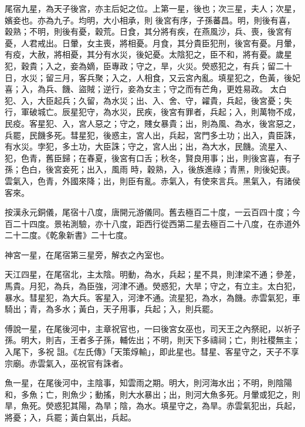 \begin{pinyinscope}
 尾宿九星，為天子後宮，亦主后妃之位。上第一星，後也；次三星，夫人；次星，嬪妾也。亦為九子。均明，大小相承，則
 後宮有序，子孫蕃昌。明，則後有喜，穀熟；不明，則後有憂，穀荒。日食，其分將有疾，在燕風沙，兵、喪，後宮有憂，人君戒出。日暈，女主喪，將相憂。月食，其分貴臣犯刑，後宮有憂。月暈，有疫，大赦，將相憂，其分有水災，後妃憂。太陰犯之，臣不和，將有憂。歲星犯，穀貴；入之，妾為嫡，臣專政；守之，旱，火災。熒惑犯之，有兵；留二十日，水災；留三月，客兵聚；入之，人相食，又云宮內亂。填星犯之，色黃，後妃喜；入，為兵、饑、盜賊；逆行，妾為女主；守之而有芒角，更姓易政。
 太白犯、入，大臣起兵；久留，為水災；出、入、舍、守，糴貴，兵起，後宮憂；失行，軍破城亡。辰星犯守，為水災，民疾，後宮有罪者，兵起；入，則萬物不成，民疫。客星犯、入，宮人惡之；守之，賤女暴貴；出，則為風、為水，後宮惡之，兵罷，民饑多死。彗星犯，後惑主，宮人出，兵起，宮門多土功；出入，貴臣誅，有水災。孛犯，多土功，大臣誅；守之，宮人出；出，為大水，民饑。流星入、犯，色青，舊臣歸；在春夏，後宮有口舌；秋冬，賢良用事；出，則後宮喜，有子孫；色白，後宮妾死；出入，風雨
 時，穀熟，入，後族進祿；青黑，則後妃喪。雲氣入，色青，外國來降；出，則臣有亂。赤氣入，有使來言兵。黑氣入，有諸侯客來。



 按漢永元銅儀，尾宿十八度，唐開元游儀同。舊去極百二十度，一云百四十度；今百二十四度。景祐測驗，亦十八度，距西行從西第二星去極百二十八度，在赤道外二十二度。《乾象新書》二十七度。



 神宮一星，在尾宿第三星旁，解衣之內室也。



 天江四星，在尾宿北，主太陰。明動，為水，兵起；星不具，則津梁不通；參差，馬貴。月犯，為兵，為臣強，河津不通。熒惑犯，大旱；守之，有立主。太白犯，暴水。彗星犯，為大兵。客星入，河津不通。流星犯，為水，為饑。赤雲氣犯，車騎出；青，為多水；黃白，天子用事，兵起；入，則兵罷。



 傅說一星，在尾後河中，主章祝官也，一曰後宮女巫也，司天王之內祭祀，以祈子孫。明大，則吉，王者多子孫，輔佐出；不明，則天下多禱祠；亡，則社稷無主；入尾下，多祝
 詛。《左氏傳》「天策焞輸」，即此星也。彗星、客星守之，天子不享宗廟。赤雲氣入，巫祝官有誅者。



 魚一星，在尾後河中，主陰事，知雲雨之期。明大，則河海水出；不明，則陰陽和，多魚；亡，則魚少；動搖，則大水暴出；出，則河大魚多死。月暈或犯之，則旱，魚死。熒惑犯其陽，為旱；陰，為水。填星守之，為旱。赤雲氣犯出，兵起，將憂；入，兵罷；黃白氣出，兵起。




\end{pinyinscope}
